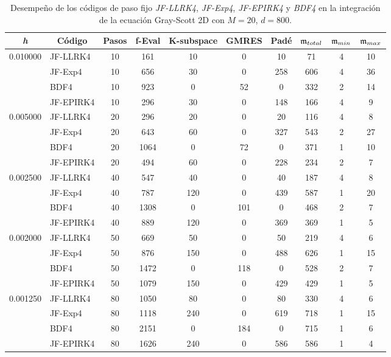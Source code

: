 \begin{table}[htb]
	\caption{Desempeño de los códigos de paso fijo \textit{JF-LLRK4}, \textit{JF-Exp4}, \textit{JF-EPIRK4} y \textit{BDF4} en la integración de la ecuación Gray-Scott 2D con $M=20$, $d=800$.}
	\centering
	\begin{adjustbox}{width=0.9\columnwidth,center}
		\begin{tabular}{cccccccccc}
			\hline
			\textit{h} & Código & Pasos & f-Eval & K-subspace & GMRES & Padé & $\mathfrak{m}_{total}$ & $\mf%
			_{min}$ & $\mathfrak{m}_{max}$ \\ \hline
			0.010000 & \multicolumn{1}{l}{JF-LLRK4} & 10 & 161 & 10 & 0 & 10 & 71 & 4 &
			10 \\
			& \multicolumn{1}{l}{JF-Exp4} & 10 & 656 & 30 & 0 & 258 & 606 & 4 & 36 \\
			& \multicolumn{1}{l}{BDF4} & 10 & 923 & 0 & 52 & 0 & 332 & 2 & 14 \\
			& \multicolumn{1}{l}{JF-EPIRK4} & 10 & 296 & 30 & 0 & 148 & 166 & 4 & 9 \\
			0.005000 & \multicolumn{1}{l}{JF-LLRK4} & 20 & 296 & 20 & 0 & 20 & 116 & 4 &
			8 \\
			& \multicolumn{1}{l}{JF-Exp4} & 20 & 643 & 60 & 0 & 327 & 543 & 2 & 27 \\
			& \multicolumn{1}{l}{BDF4} & 20 & 1064 & 0 & 72 & 0 & 371 & 1 & 10 \\
			& \multicolumn{1}{l}{JF-EPIRK4} & 20 & 494 & 60 & 0 & 228 & 234 & 2 & 7 \\
			0.002500 & \multicolumn{1}{l}{JF-LLRK4} & 40 & 547 & 40 & 0 & 40 & 187 & 4 &
			8 \\
			& \multicolumn{1}{l}{JF-Exp4} & 40 & 787 & 120 & 0 & 439 & 587 & 1 & 20 \\
			& \multicolumn{1}{l}{BDF4} & 40 & 1308 & 0 & 101 & 0 & 468 & 2 & 7 \\
			& \multicolumn{1}{l}{JF-EPIRK4} & 40 & 889 & 120 & 0 & 369 & 369 & 1 & 5 \\
			0.002000 & \multicolumn{1}{l}{JF-LLRK4} & 50 & 669 & 50 & 0 & 50 & 219 & 4 &
			6 \\
			& \multicolumn{1}{l}{JF-Exp4} & 50 & 876 & 150 & 0 & 488 & 626 & 1 & 15 \\
			& \multicolumn{1}{l}{BDF4} & 50 & 1472 & 0 & 118 & 0 & 528 & 2 & 7 \\
			& \multicolumn{1}{l}{JF-EPIRK4} & 50 & 1079 & 150 & 0 & 429 & 429 & 1 & 5 \\
			0.001250 & \multicolumn{1}{l}{JF-LLRK4} & 80 & 1050 & 80 & 0 & 80 & 330 & 4
			& 6 \\
			& \multicolumn{1}{l}{JF-Exp4} & 80 & 1118 & 240 & 0 & 619 & 718 & 1 & 15 \\
			& \multicolumn{1}{l}{BDF4} & 80 & 2151 & 0 & 184 & 0 & 715 & 1 & 6 \\
			& \multicolumn{1}{l}{JF-EPIRK4} & 80 & 1626 & 240 & 0 & 586 & 586 & 1 & 4 \\
			\hline
		\end{tabular}
	\end{adjustbox}
	\label{tab:gs2d}
\end{table}

